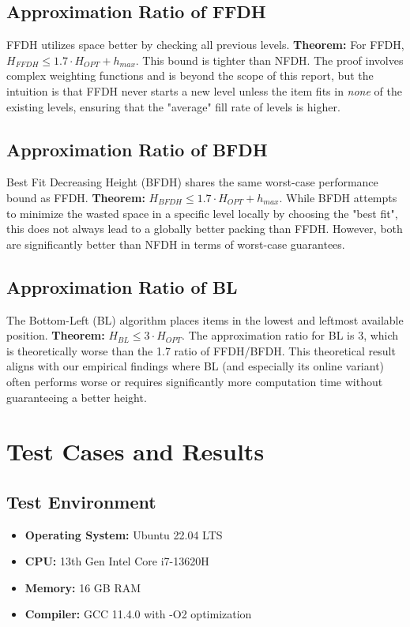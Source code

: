 \documentclass[a4paper,12pt]{article}
\begin{document}
\subsection{Approximation Ratio of FFDH}
FFDH utilizes space better by checking all previous levels.
\textbf{Theorem:} For FFDH, $H_{FFDH} \le 1.7 \cdot H_{OPT} + h_{max}$.
This bound is tighter than NFDH. The proof involves complex weighting functions and is beyond the scope of this report, but the intuition is that FFDH never starts a new level unless the item fits in \textit{none} of the existing levels, ensuring that the "average" fill rate of levels is higher.

\subsection{Approximation Ratio of BFDH}
Best Fit Decreasing Height (BFDH) shares the same worst-case performance bound as FFDH.
\textbf{Theorem:} $H_{BFDH} \le 1.7 \cdot H_{OPT} + h_{max}$.
While BFDH attempts to minimize the wasted space in a specific level locally by choosing the "best fit", this does not always lead to a globally better packing than FFDH. However, both are significantly better than NFDH in terms of worst-case guarantees.

\subsection{Approximation Ratio of BL}
The Bottom-Left (BL) algorithm places items in the lowest and leftmost available position.
\textbf{Theorem:} $H_{BL} \le 3 \cdot H_{OPT}$.
The approximation ratio for BL is 3, which is theoretically worse than the 1.7 ratio of FFDH/BFDH. This theoretical result aligns with our empirical findings where BL (and especially its online variant) often performs worse or requires significantly more computation time without guaranteeing a better height.

\section{Test Cases and Results}

\subsection{Test Environment}
\begin{itemize}
    \item \textbf{Operating System:} Ubuntu 22.04 LTS
    \item \textbf{CPU:} 13th Gen Intel Core i7-13620H
    \item \textbf{Memory:} 16 GB RAM
    \item \textbf{Compiler:} GCC 11.4.0 with -O2 optimization
\end{itemize}
\end{document}
